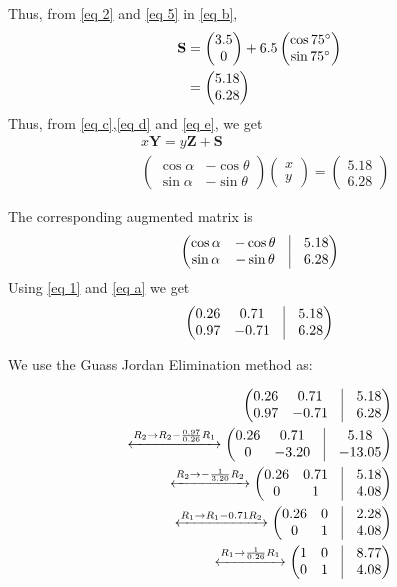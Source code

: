 \documentclass{beamer}
\newcommand{\myvec}[1]{\ensuremath{\begin{pmatrix}#1\end{pmatrix}}}
\renewcommand{\vec}[1]{\mathbf{#1}}
\begin{document}
\begin{frame}
Thus, 
from  \eqref{eq 2} and \eqref{eq 5} in \eqref{eq b},
\begin{align}
\vec{S} &=\myvec{3.5\\0} + 6.5\myvec{\cos 75\degree \\\sin 75\degree }\label{eq e}
\\
&=\myvec{5.18\\6.28}
\end{align}
Thus, 
from \eqref{eq c},\eqref{eq d} and \eqref{eq e}, we get
\begin{align}
&x\vec{Y} = y\vec{Z}+\vec{S}\\
&\myvec{\cos\alpha & -\cos\theta \\ \sin\alpha & -\sin\theta} \myvec{x \\ y} = \myvec{5.18\\6.28}
\end{align}
\end{frame}
\begin{frame}
The corresponding augmented matrix is 
\begin{align}
		\myvec{
		\cos\alpha & -\cos\theta & \vrule & 5.18 \\
		\sin\alpha & -\sin\theta & \vrule & 6.28 \\
	}
\end{align}
Using \eqref{eq 1} and \eqref{eq a} we get
\begin{align}
		\myvec{
		0.26 & 0.71 & \vrule & 5.18 \\
		0.97 & -0.71 & \vrule & 6.28 \\
	}
\end{align}
\end{frame}
\begin{frame}
We use the Guass Jordan Elimination method as:

\begin{align}
	\myvec{
		0.26 & 0.71 & \vrule & 5.18 \\
		0.97 & -0.71 & \vrule & 6.28 \\
	}
	\\
	\xleftrightarrow[]{R_2 \rightarrow R_2 - \frac{0.97}{0.26}R_1}
	\myvec{
		0.26 & 0.71 & \vrule & 5.18 \\
		0 & -3.20 & \vrule & -13.05 \\
	}
	\\
	\xleftrightarrow[]{R_2\rightarrow -\frac{1}{3.20}R_2}
	\myvec{
		0.26 & 0.71 & \vrule & 5.18 \\
		0 & 1 & \vrule & 4.08 \\
	}
	\\
	\xleftrightarrow[]{R_1 \rightarrow R_1 - 0.71 R_2}
	\myvec{
		0.26 & 0 & \vrule & 2.28 \\
		0 & 1 & \vrule & 4.08 \\
	}
	\\
	\xleftrightarrow[]{R_1 \rightarrow \frac{1}{0.26}R_1}
	\myvec{
		1 & 0 & \vrule & 8.77 \\
		0 & 1 & \vrule & 4.08 \\
	}
\end{align}
\end{frame}
\end{document}
